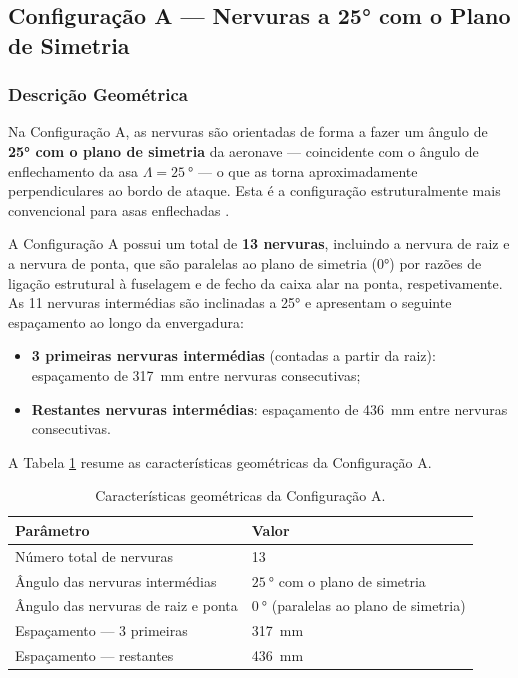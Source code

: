 \documentclass[a4paper,fleqn,noprintline]{cas-dc}
\begin{document}
\subsection{Configuração A --- Nervuras a 25° com o Plano de Simetria}

\subsubsection{Descrição Geométrica}

Na Configuração A, as nervuras são orientadas de forma a fazer um ângulo de \textbf{25° com o plano de simetria} da aeronave --- coincidente com o ângulo de enflechamento da asa $\Lambda = \qty{25}{\degree}$ --- o que as torna aproximadamente perpendiculares ao bordo de ataque. Esta é a configuração estruturalmente mais convencional para asas enflechadas \cite{Niu1988, Megson2012}.

A Configuração A possui um total de \textbf{13 nervuras}, incluindo a nervura de raiz e a nervura de ponta, que são paralelas ao plano de simetria (0°) por razões de ligação estrutural à fuselagem e de fecho da caixa alar na ponta, respetivamente. As 11 nervuras intermédias são inclinadas a 25° e apresentam o seguinte espaçamento ao longo da envergadura:

\begin{itemize}
    \item \textbf{3 primeiras nervuras intermédias} (contadas 
    a partir da raiz): espaçamento de \SI{317}{\milli\meter} 
    entre nervuras consecutivas;
    \item \textbf{Restantes nervuras intermédias}: espaçamento 
    de \SI{436}{\milli\meter} entre nervuras consecutivas.
\end{itemize}

A Tabela \ref{tab:config_a} resume as características 
geométricas da Configuração A.

\begin{table}[h!]
\centering
\caption{Características geométricas da Configuração A.}
\label{tab:config_a}
\renewcommand{\arraystretch}{1.4}
\begin{tabularx}{\textwidth}{p{6cm} X}
\toprule
\textbf{Parâmetro} & \textbf{Valor} \\
\midrule
Número total de nervuras            & 13 \\
Ângulo das nervuras intermédias     & $\qty{25}{\degree}$ com o plano de simetria \\
Ângulo das nervuras de raiz e ponta & $\qty{0}{\degree}$ (paralelas ao plano de simetria) \\
Espaçamento --- 3 primeiras         & \SI{317}{\milli\meter} \\
Espaçamento --- restantes           & \SI{436}{\milli\meter} \\
\bottomrule
\end{tabularx}
\end{table}
\end{document}
